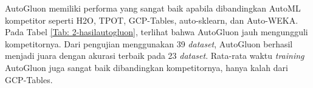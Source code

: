 AutoGluon memiliki performa yang sangat baik apabila dibandingkan AutoML kompetitor seperti H2O, TPOT, GCP-Tables, auto-sklearn, dan Auto-WEKA. Pada Tabel
\ref{Tab: 2-hasilautogluon}, terlihat bahwa AutoGluon jauh mengungguli kompetitornya. Dari pengujian menggunakan 39 \emph{dataset}, AutoGluon berhasil menjadi
juara dengan akurasi terbaik pada 23 \emph{dataset}. Rata-rata waktu \emph{training} AutoGluon juga sangat baik dibandingkan kompetitornya, hanya kalah dari
GCP-Tables. \cite{agtabular}

\begin{table}[!ht]
	\centering
	\caption[Perbandingan performa AutoGluon dengan AutoML kompetitor]{Perbandingan performa AutoGluon dengan AutoML kompetitor \cite{agtabular}}
	\vspace{0.5em}
	\label{Tab: 2-hasilautogluon}
\end{table}